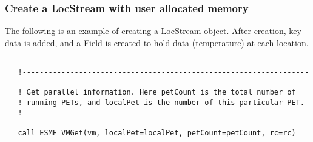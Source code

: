  
\setlength{\oldparskip}{\parskip}
\setlength{\parskip}{1.5ex}
\setlength{\oldparindent}{\parindent}
\setlength{\parindent}{0pt}
\setlength{\oldbaselineskip}{\baselineskip}
\setlength{\baselineskip}{11pt}
 
\def\bv{\begin{verbatim}}
\def\ev{\end{verbatim}}
\def\be{\begin{equation}}
\def\ee{\end{equation}}
\def\bea{\begin{eqnarray}}
\def\eea{\end{eqnarray}}
\def\bi{\begin{itemize}}
\def\ei{\end{itemize}}
\def\bn{\begin{enumerate}}
\def\en{\end{enumerate}}
\def\bd{\begin{description}}
\def\ed{\end{description}}
\def\({\left (}
\def\){\right )}
\def\[{\left [}
\def\]{\right ]}
\def\<{\left  \langle}
\def\>{\right \rangle}
\def\cI{{\cal I}}
\def\diag{\mathop{\rm diag}}
\def\tr{\mathop{\rm tr}}


 

  \subsubsection{Create a LocStream with user allocated memory}
  
   The following is an example of creating a LocStream object.
   After creation, key data is added, and a Field is created to hold data
   (temperature) at each location. 
   

 \begin{verbatim}

   !-------------------------------------------------------------------
   ! Get parallel information. Here petCount is the total number of 
   ! running PETs, and localPet is the number of this particular PET.
   !-------------------------------------------------------------------
   call ESMF_VMGet(vm, localPet=localPet, petCount=petCount, rc=rc)

 
\end{verbatim}
 
